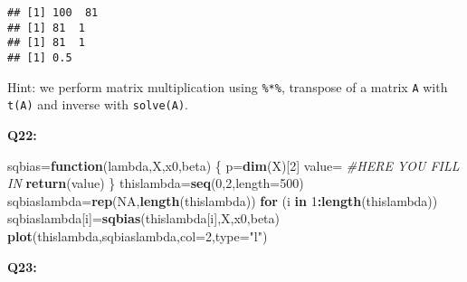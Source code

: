\documentclass[]{article}
\newenvironment{Shaded}{\begin{snugshade}}{\end{snugshade}}
\newcommand{\KeywordTok}[1]{\textcolor[rgb]{0.13,0.29,0.53}{\textbf{#1}}}
\newcommand{\DataTypeTok}[1]{\textcolor[rgb]{0.13,0.29,0.53}{#1}}
\newcommand{\DecValTok}[1]{\textcolor[rgb]{0.00,0.00,0.81}{#1}}
\newcommand{\StringTok}[1]{\textcolor[rgb]{0.31,0.60,0.02}{#1}}
\newcommand{\CommentTok}[1]{\textcolor[rgb]{0.56,0.35,0.01}{\textit{#1}}}
\newcommand{\OtherTok}[1]{\textcolor[rgb]{0.56,0.35,0.01}{#1}}
\newcommand{\ControlFlowTok}[1]{\textcolor[rgb]{0.13,0.29,0.53}{\textbf{#1}}}
\newcommand{\OperatorTok}[1]{\textcolor[rgb]{0.81,0.36,0.00}{\textbf{#1}}}
\newcommand{\NormalTok}[1]{#1}
\begin{document}
\begin{Shaded}
\end{Shaded}

\begin{verbatim}
## [1] 100  81
## [1] 81  1
## [1] 81  1
## [1] 0.5
\end{verbatim}

Hint: we perform matrix multiplication using \texttt{\%*\%}, transpose
of a matrix \texttt{A} with \texttt{t(A)} and inverse with
\texttt{solve(A)}.

\textbf{Q22:}

\begin{Shaded}
\begin{Highlighting}[]
\NormalTok{sqbias=}\ControlFlowTok{function}\NormalTok{(lambda,X,x0,beta)}
\NormalTok{\{}
\NormalTok{  p=}\KeywordTok{dim}\NormalTok{(X)[}\DecValTok{2}\NormalTok{]}
\NormalTok{  value=}\StringTok{ }\CommentTok{#HERE YOU FILL IN}
\StringTok{  }\KeywordTok{return}\NormalTok{(value)}
\NormalTok{\}}
\NormalTok{thislambda=}\KeywordTok{seq}\NormalTok{(}\DecValTok{0}\NormalTok{,}\DecValTok{2}\NormalTok{,}\DataTypeTok{length=}\DecValTok{500}\NormalTok{)}
\NormalTok{sqbiaslambda=}\KeywordTok{rep}\NormalTok{(}\OtherTok{NA}\NormalTok{,}\KeywordTok{length}\NormalTok{(thislambda))}
\ControlFlowTok{for}\NormalTok{ (i }\ControlFlowTok{in} \DecValTok{1}\OperatorTok{:}\KeywordTok{length}\NormalTok{(thislambda)) sqbiaslambda[i]=}\KeywordTok{sqbias}\NormalTok{(thislambda[i],X,x0,beta)}
\KeywordTok{plot}\NormalTok{(thislambda,sqbiaslambda,}\DataTypeTok{col=}\DecValTok{2}\NormalTok{,}\DataTypeTok{type=}\StringTok{"l"}\NormalTok{)}
\end{Highlighting}
\end{Shaded}

\textbf{Q23:}
\end{document}
